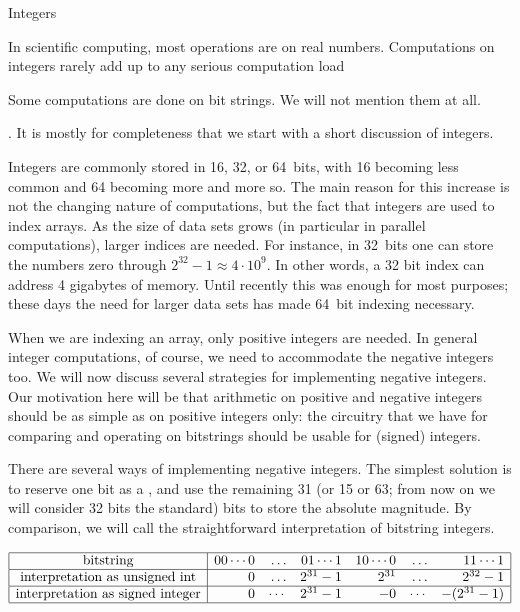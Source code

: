  {Integers}

In scientific computing, most operations are on real
numbers. Computations on integers rarely add up to any serious
computation load
\begin{footnoteenv}
  {Some computations are done on bit
    strings. We will not mention them at all.}
\end{footnoteenv}
. It is mostly for
completeness that we start with a short discussion of integers.

Integers are commonly stored in 16, 32, or 64~bits, with 16 becoming
less common and 64 becoming more and more so. The main reason for this increase is
not the changing nature of computations, but the fact that integers
are used to index arrays. As the size of data sets grows (in
particular in parallel computations), larger indices are needed. For
instance, in 32~bits one can store the numbers zero through
$2^{32}-1\approx 4\cdot 10^9$. In other words, a 32 bit index can
address 4 gigabytes of memory. Until recently this was enough for most
purposes; these days the need for larger data sets has made 64~bit
indexing necessary.

When we are indexing an array, only positive integers are needed.
In general integer computations, of course, we need to accommodate
the negative integers too. We will now discuss several strategies for
implementing negative integers. Our motivation here will be that
arithmetic on positive and negative integers should be as simple as on
positive integers only: the circuitry that we have for comparing and
operating on bitstrings should be usable for (signed) integers.

There are several ways of implementing
negative integers. The simplest solution is to reserve one bit as a
, and use the remaining 31 (or 15 or 63; from now on we will
consider 32 bits the standard) bits to store the
absolute magnitude. By comparison, we will call the straightforward
interpretation of bitstring  integers.

\[
\begin{array}{|c|rrrrrr|}
  \hline
  \hbox{bitstring}&
  00\cdots0&\ldots&01\cdots1&
  10\cdots0&\ldots&11\cdots1\\ \hline
  \hbox{interpretation as unsigned int}&
  0&\ldots&2^{31}-1&
  2^{31}&\ldots&2^{32}-1\\ \hline
  \hbox{interpretation as signed integer}&
  0&\cdots&2^{31}-1&
  -0&\cdots&-(2^{31}-1)\\
  \hline
\end{array}
\]

